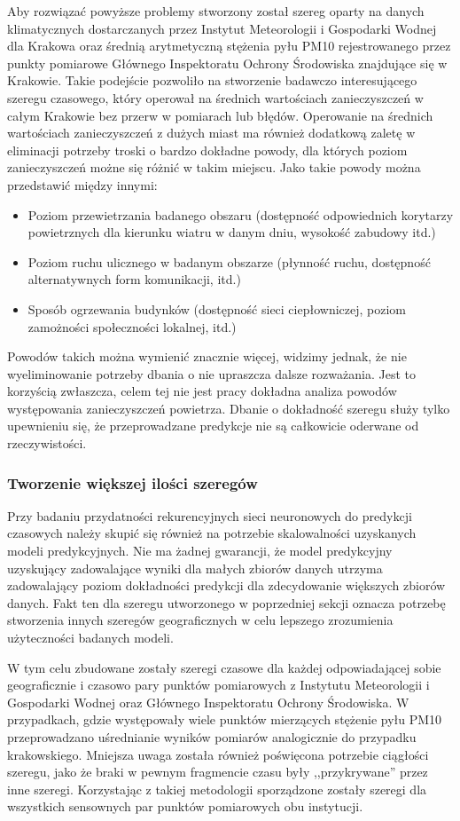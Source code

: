 \documentclass[10pt,a4paper]{article}
\begin{document}
Aby rozwiązać powyższe problemy stworzony został szereg oparty na danych klimatycznych dostarczanych przez Instytut Meteorologii i Gospodarki Wodnej dla Krakowa oraz średnią arytmetyczną stężenia pyłu PM10 rejestrowanego przez punkty pomiarowe Głównego Inspektoratu Ochrony Środowiska znajdujące się w Krakowie. Takie podejście pozwoliło na stworzenie badawczo interesującego szeregu czasowego, który operował na średnich wartościach zanieczyszczeń w całym Krakowie bez przerw w pomiarach lub błędów. 
Operowanie na średnich wartościach zanieczyszczeń z dużych miast ma również dodatkową zaletę w eliminacji potrzeby troski o bardzo dokładne powody, dla których poziom zanieczyszczeń możne się różnić w takim miejscu. Jako takie powody można przedstawić między innymi: 
\begin{itemize}
	\item Poziom przewietrzania badanego obszaru (dostępność odpowiednich korytarzy powietrznych dla kierunku wiatru w danym dniu, wysokość zabudowy itd.)
	\item Poziom ruchu ulicznego w badanym obszarze (płynność ruchu, dostępność alternatywnych form komunikacji, itd.)
	\item Sposób ogrzewania budynków (dostępność sieci ciepłowniczej, poziom zamożności społeczności lokalnej, itd.)
\end{itemize}
Powodów takich można wymienić znacznie więcej, widzimy jednak, że nie wyeliminowanie potrzeby dbania o nie upraszcza dalsze rozważania. Jest to korzyścią zwłaszcza, celem tej nie jest pracy dokładna analiza powodów występowania zanieczyszczeń powietrza. Dbanie o dokładność szeregu służy tylko upewnieniu się, że przeprowadzane predykcje nie są całkowicie oderwane od rzeczywistości. 

\subsubsection{Tworzenie większej ilości szeregów}
Przy badaniu przydatności rekurencyjnych sieci neuronowych do predykcji czasowych należy skupić się również na potrzebie skalowalności uzyskanych modeli predykcyjnych. Nie ma żadnej gwarancji, że model predykcyjny uzyskujący zadowalające wyniki dla małych zbiorów danych utrzyma zadowalający poziom dokładności predykcji dla zdecydowanie większych zbiorów danych. Fakt ten dla szeregu utworzonego w poprzedniej sekcji oznacza potrzebę stworzenia innych szeregów geograficznych w celu lepszego zrozumienia użyteczności badanych modeli.

W tym celu zbudowane zostały szeregi czasowe dla każdej odpowiadającej sobie geograficznie i czasowo pary punktów pomiarowych z Instytutu Meteorologii i Gospodarki Wodnej oraz Głównego Inspektoratu Ochrony Środowiska. W przypadkach, gdzie występowały wiele punktów mierzących stężenie pyłu PM10 przeprowadzano uśrednianie wyników pomiarów analogicznie do przypadku krakowskiego. Mniejsza uwaga została również poświęcona potrzebie ciągłości szeregu, jako że braki w pewnym fragmencie czasu były ,,przykrywane'' przez inne szeregi. Korzystając z takiej metodologii sporządzone zostały szeregi dla wszystkich sensownych par punktów pomiarowych obu instytucji.
\end{document}
